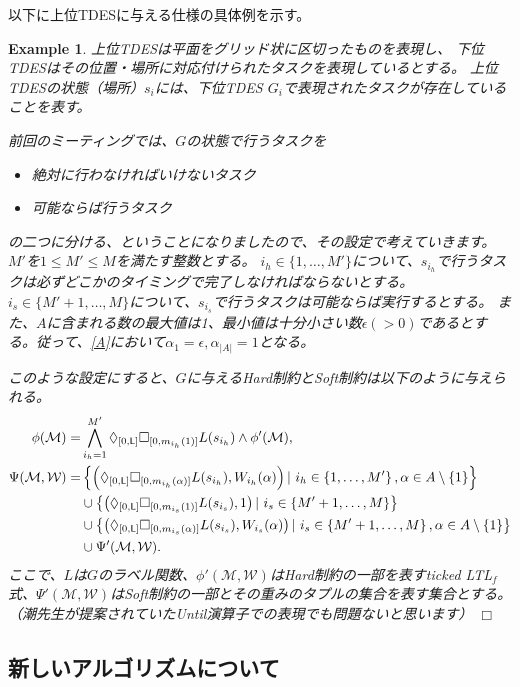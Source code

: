 \documentclass[ 10pt]{jsarticle}
\newcommand{\qedwhite}{\hfill \ensuremath{\Box}}
\newtheorem{exa}{Example}
\newcommand{\req}[1]{\eqref{#1}}
\newcommand{\Len}{{\sf L}}
\begin{document}
以下に上位TDESに与える仕様の具体例を示す。
\begin{exa}
上位TDESは平面をグリッド状に区切ったものを表現し、
下位TDESはその位置・場所に対応付けられたタスクを表現しているとする。
上位TDESの状態（場所）$s_i$には、下位TDES $G_i$で表現されたタスクが存在していることを表す。

前回のミーティングでは、$G$の状態で行うタスクを
\begin{itemize}
\item
絶対に行わなければいけないタスク
\item
可能ならば行うタスク
\end{itemize}
の二つに分ける、ということになりましたので、その設定で考えていきます。
$M'$を$1\leq M'\leq M$を満たす整数とする。
$i_h\in\{1,\ldots, M'\}$について、$s_{i_h}$で行うタスクは必ずどこかのタイミングで完了しなければならないとする。
$i_s\in\{M'+1,\ldots, M\}$について、$s_{i_s}$で行うタスクは可能ならば実行するとする。
また、$A$に含まれる数の最大値は1、最小値は十分小さい数$\epsilon(>0)$であるとする。従って、\req{A}において$\alpha_1=\epsilon,\alpha_{|A|}=1$となる。

このような設定にすると、$G$に与えるHard制約とSoft制約は以下のように与えられる。
\begin{align}
\phi(\mathcal{M})=&\bigwedge_{i_h=1}^{M'}\Diamond_{[0,\Len]}\Box_{[0,m_{i_h}(1)]}L(s_{i_h}) \land \phi'(\mathcal{M}),\\
%
\Psi(\mathcal{M},\mathcal{W})
=&\left\{
\left(\Diamond_{[0,\Len]}\Box_{[0,m_{i_h}(\alpha)]}L(s_{i_h}),W_{i_h}(\alpha)
\right)|\ i_h\in\left\{1,\ldots, M'\right\}, \alpha\in A\setminus\{1\}
\right\}
\notag\\
&\cup
\left\{
\left(\Diamond_{[0,\Len]}\Box_{[0,m_{i_s}(1)]}L(s_{i_s}),1
\right)|\ i_s\in\left\{M'+1,\ldots, M\right\}
\right\}
\notag\\
&\cup
\left\{
\left(\Diamond_{[0,\Len]}\Box_{[0,m_{i_s}(\alpha)]}L(s_{i_s}),W_{i_s}(\alpha)
\right)|\ i_s\in\left\{M'+1,\ldots, M\right\}, \alpha\in A\setminus\{1\}
\right\}
\notag \\
&\cup \Psi'(\mathcal{M},\mathcal{W}).
\end{align}
ここで、$L$は$G$のラベル関数、$\phi'(\mathcal{M},\mathcal{W})$はHard制約の一部を表すticked LTL${}_f$式、$\Psi'(\mathcal{M},\mathcal{W})$はSoft制約の一部とその重みのタプルの集合を表す集合とする。（潮先生が提案されていたUntil演算子での表現でも問題ないと思います）
\qedwhite
\end{exa}
%
\subsection{新しいアルゴリズムについて}\label{app}
%
\end{document}
